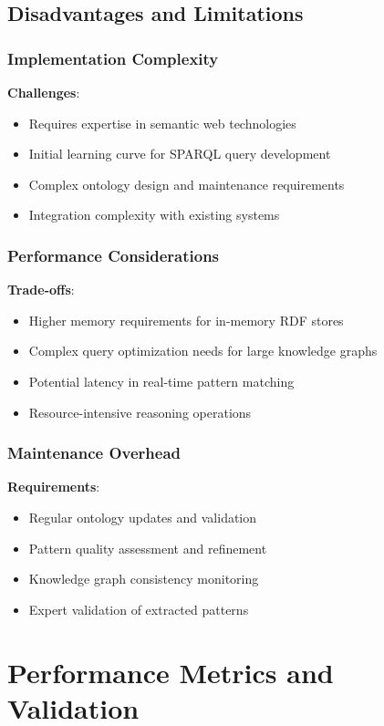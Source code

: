 \documentclass[12pt,a4paper]{article}
\begin{document}
\subsection{Disadvantages and Limitations}

\subsubsection{Implementation Complexity}
\textbf{Challenges}:
\begin{itemize}
    \item Requires expertise in semantic web technologies
    \item Initial learning curve for SPARQL query development
    \item Complex ontology design and maintenance requirements
    \item Integration complexity with existing systems
\end{itemize}

\subsubsection{Performance Considerations}
\textbf{Trade-offs}:
\begin{itemize}
    \item Higher memory requirements for in-memory RDF stores
    \item Complex query optimization needs for large knowledge graphs
    \item Potential latency in real-time pattern matching
    \item Resource-intensive reasoning operations
\end{itemize}

\subsubsection{Maintenance Overhead}
\textbf{Requirements}:
\begin{itemize}
    \item Regular ontology updates and validation
    \item Pattern quality assessment and refinement
    \item Knowledge graph consistency monitoring
    \item Expert validation of extracted patterns
\end{itemize}

\section{Performance Metrics and Validation}
\end{document}
